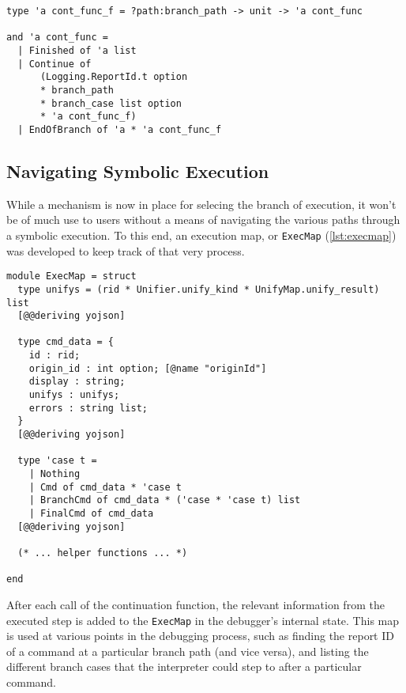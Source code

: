 \begin{lstlisting}[caption={
  The new \texttt{cont\_func} type, in the \texttt{GInterpreter} module
  \label{lst:contfunc-type-new}}, style=code, numbers=none]
type 'a cont_func_f = ?path:branch_path -> unit -> 'a cont_func

and 'a cont_func =
  | Finished of 'a list
  | Continue of
      (Logging.ReportId.t option
      * branch_path
      * branch_case list option
      * 'a cont_func_f)
  | EndOfBranch of 'a * 'a cont_func_f
\end{lstlisting}


\subsection{Navigating Symbolic Execution}

While a mechanism is now in place for selecing the branch of execution, it
won't be of much use to users without a means of navigating the various paths
through a symbolic execution. To this end, an execution map, or \texttt{ExecMap}
(\autoref{lst:execmap}) was developed to keep track of that very process.

\begin{lstlisting}[caption={
  The types of the \texttt{ExecMap} module, inside the \texttt{Debugger} module
  \label{lst:execmap}}, style=code, numbers=none]
module ExecMap = struct
  type unifys = (rid * Unifier.unify_kind * UnifyMap.unify_result) list
  [@@deriving yojson]

  type cmd_data = {
    id : rid;
    origin_id : int option; [@name "originId"]
    display : string;
    unifys : unifys;
    errors : string list;
  }
  [@@deriving yojson]

  type 'case t =
    | Nothing
    | Cmd of cmd_data * 'case t
    | BranchCmd of cmd_data * ('case * 'case t) list
    | FinalCmd of cmd_data
  [@@deriving yojson]

  (* ... helper functions ... *)

end
\end{lstlisting}

After each call of the continuation function, the relevant information from
the executed step is added to the \texttt{ExecMap} in the debugger's internal
state. This map is used at various points in the debugging process, such as
finding the report ID of a command at a particular branch path (and vice versa),
and listing the different branch cases that the interpreter could step to after
a particular command.

